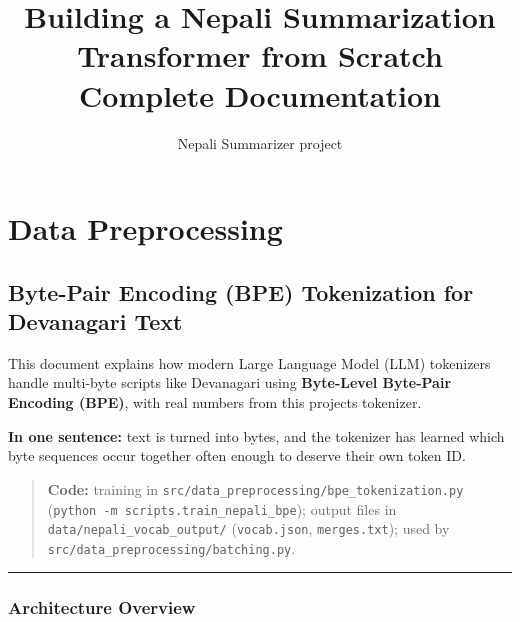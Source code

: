 \documentclass[11pt,a4paper,oneside]{report}
\title{Building a Nepali Summarization Transformer from Scratch\\[0.4em]
  \large Complete Documentation}
\author{Nepali Summarizer project}
\date{}
\begin{document}
\hypersetup{pageanchor=false}
\maketitle
\hypersetup{pageanchor=true}
\tableofcontents

\part{Data Preprocessing}


\chapter{Byte-Pair Encoding (BPE) Tokenization for Devanagari Text}\label{byte-pair-encoding-bpe-tokenization-for-devanagari-text}

This document explains how modern Large Language Model (LLM) tokenizers handle multi-byte scripts like Devanagari using \textbf{Byte-Level Byte-Pair Encoding (BPE)}, with real numbers from this project\textquotesingle s tokenizer.

\textbf{In one sentence:} text is turned into bytes, and the tokenizer has learned which byte sequences occur together often enough to deserve their own token ID.

\begin{quote}
\textbf{Code:} training in \texttt{src/\allowbreak{}data\_\allowbreak{}preprocessing/\allowbreak{}bpe\_\allowbreak{}tokenization.\allowbreak{}py} (\texttt{python\ -m\ scripts.\allowbreak{}train\_\allowbreak{}nepali\_\allowbreak{}bpe}); output files in \texttt{data/\allowbreak{}nepali\_\allowbreak{}vocab\_\allowbreak{}output/\allowbreak{}} (\texttt{vocab.\allowbreak{}json}, \texttt{merges.\allowbreak{}txt}); used by \texttt{src/\allowbreak{}data\_\allowbreak{}preprocessing/\allowbreak{}batching.\allowbreak{}py}.
\end{quote}

\begin{center}\rule{0.5\linewidth}{0.5pt}\end{center}

\section{Architecture Overview}\label{architecture-overview}
\end{document}
